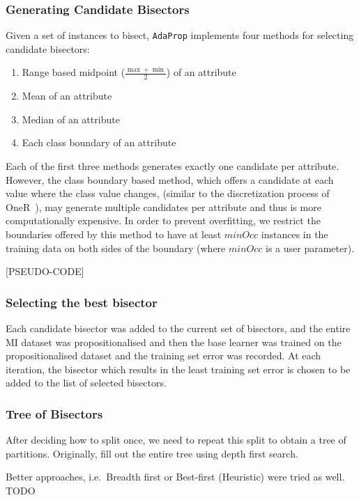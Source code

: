 \documentclass[a4paper,12pt]{article} %
\newcommand{\AdaProp}{\texttt{AdaProp}\xspace}
\begin{document}
\subsubsection{Generating Candidate Bisectors}

Given a set of instances to bisect, 
    \AdaProp implements four methods for selecting candidate bisectors:
\begin{enumerate}
\item Range based midpoint ($\frac{\max+\min}{2}$) of an attribute
\item Mean of an attribute
\item Median of an attribute
\item Each class boundary of an attribute 
\end{enumerate}

Each of the first three methods generates exactly one candidate per attribute.
However, the class boundary based method, 
    which offers a candidate at each value where the class value changes,
    (similar to the discretization process of OneR~\cite{holte}), 
    may generate multiple candidates per attribute and 
    thus is more computationally expensive.
In order to prevent overfitting, 
    we restrict the boundaries offered by this method to have at least $minOcc$ instances
    in the training data on both sides of the boundary 
    (where $minOcc$ is a user parameter).

[PSEUDO-CODE]

\subsubsection{Selecting the best bisector}
Each candidate bisector was added to the current set of bisectors,
    and the entire MI dataset was propositionalised and then
    the base learner was trained on the propositionalised dataset
    and the training set error was recorded.
At each iteration, the bisector which results in the least training set error 
    is chosen to be added to the list of selected bisectors.

\subsubsection{Tree of Bisectors}

After deciding how to split once, we need to repeat this split to obtain a tree of partitions.
Originally, fill out the entire tree using depth first search.

Better approaches, i.e.\ Breadth first or Best-first (Heuristic) were tried as well. TODO
\end{document}
